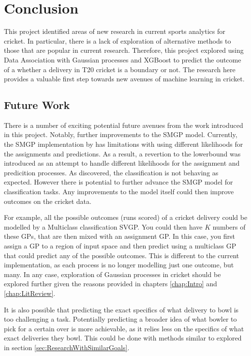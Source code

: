 \documentclass[12pt,a4paper]{report}
\theoremstyle{definition}
\begin{document}
\chapter{Conclusion}

This project identified areas of new research in current sports analytics for cricket.
In particular, there is a lack of exploration of alternative methods to those that are popular in current research.
Therefore, this project explored using Data Association with Gaussian processes and XGBoost to predict the outcome of a whether a delivery in T20 cricket is a boundary or not.
The research here provides a valuable first step towards new avenues of machine learning in cricket.

\section{Future Work}

There is a number of exciting potential future avenues from the work introduced in this project.
Notably, further improvements to the SMGP model.
Currently, the SMGP implementation by \citet{Lui2021} has limitations with using different likelihoods for the assignments and predictions.
As a result, a revertion to the \citet{Kaiser2020} lowerbound was introduced as an attempt to handle different likelihoods for the assignment and predicition processes.
As discovered, the classification is not behaving as expected.
However there is potential to further advance the SMGP model for classification tasks.
Any improvements to the model itself could then improve outcomes on the cricket data.

For example, all the possible outcomes (runs scored) of a cricket delivery could be modelled by a Multiclass classification SVGP.
You could then have $K$ numbers of these GPs, that are then mixed with an assignment GP.
In this case, you first assign a GP to a region of input space and then predict using a multiclass GP that could predict any of the possible outcomes.
This is different to the current implementation, as each process is no longer modelling just one outcome, but many.
In any case, exploration of Gaussian processes in cricket should be explored further given the reasons provided in chapters \ref{chap:Intro} and \ref{chap:LitReview}.

It is also possible that predicting the exact specifics of what delivery to bowl is too challenging a task.
Potentially predicting a broader idea of what bowler to pick for a certain over is more achievable, as it relies less on the specifics of what exact deliveries they bowl.
This could be done with methods similar to \citet{silver2021baseball} explored in section \ref{sec:ResearchWithSimilarGoals}.
\end{document}
